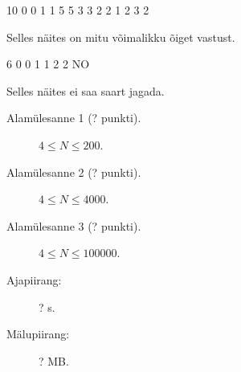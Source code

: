 ﻿\documentclass{boi2014-et}
\begin{document}
    \Examples
    \example
    {
        10  0  0  1  1  5  5  3  3  2  2
    }
    {
        1 2 3 2
    }
    {
        Selles näites on mitu võimalikku õiget vastust.

        \begin{center}
        \end{center}
    }

    \example
    {
        6  0  0  1  1  2  2
    }
    {
        NO
    }
    {
        Selles näites ei saa saart jagada.
        \begin{center}
        \end{center}
    }

    \Scoring

    \begin{description}
        \item[Alamülesanne 1 (? punkti).] $4 \le N \le 200$.
        \item[Alamülesanne 2 (? punkti).] $4 \le N \le 4 000$.
        \item[Alamülesanne 3 (? punkti).] $4 \le N \le 100 000$.
    \end{description}

    \Constraints

    \begin{description}
        \item[Ajapiirang:] ? s.
        \item[Mälupiirang:] ? MB.
    \end{description}
\end{document}

